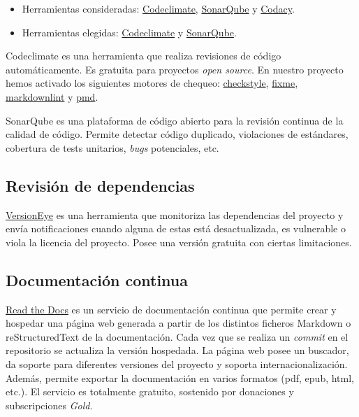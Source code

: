 \begin{itemize}
\tightlist
\item
  Herramientas consideradas:
  \href{https://codeclimate.com/}{Codeclimate},
  \href{https://sonarqube.com/}{SonarQube} y
  \href{https://www.codacy.com/}{Codacy}.
\item
  Herramientas elegidas: \href{https://codeclimate.com/}{Codeclimate} y
  \href{https://sonarqube.com/}{SonarQube}.
\end{itemize}

Codeclimate es una herramienta que realiza revisiones de código
automáticamente. Es gratuita para proyectos \emph{open source}. En
nuestro proyecto hemos activado los siguientes motores de chequeo:
\href{https://docs.codeclimate.com/docs/checkstyle}{checkstyle},
\href{https://docs.codeclimate.com/docs/fixme}{fixme},
\href{https://docs.codeclimate.com/docs/markdownlint}{markdownlint} y
\href{https://docs.codeclimate.com/docs/pmd}{pmd}.

SonarQube es una plataforma de código abierto para la revisión continua
de la calidad de código. Permite detectar código duplicado, violaciones
de estándares, cobertura de tests unitarios, \emph{bugs} potenciales,
etc.

\subsection{Revisión de dependencias}\label{revision-de-dependencias}

\href{https://www.versioneye.com/}{VersionEye} es una herramienta que monitoriza las dependencias del
proyecto y envía notificaciones cuando alguna de estas está
desactualizada, es vulnerable o viola la licencia del proyecto. Posee
una versión gratuita con ciertas limitaciones.

\subsection{Documentación continua}\label{documentacion-continua}

\href{https://readthedocs.org/}{Read the Docs} es un servicio de documentación continua que permite crear
y hospedar una página web generada a partir de los distintos ficheros
Markdown o reStructuredText de la documentación. Cada vez que se realiza
un \emph{commit} en el repositorio se actualiza la versión hospedada. La
página web posee un buscador, da soporte para diferentes versiones del
proyecto y soporta internacionalización. Además, permite exportar la
documentación en varios formatos (pdf, epub, html, etc.). El servicio es
totalmente gratuito, sostenido por donaciones y subscripciones
\emph{Gold}.

